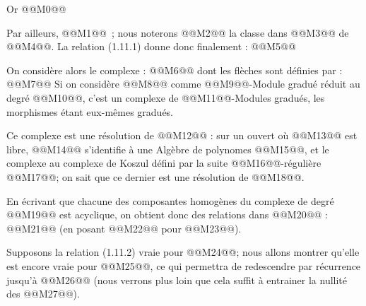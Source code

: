 
Or
@@M0@@

Par
ailleurs, @@M1@@~; nous noterons @@M2@@ la classe dans @@M3@@ de @@M4@@. La relation (1.11.1) donne donc finalement :
@@M5@@

On considère alors le complexe :
@@M6@@
dont les flèches sont définies par :
@@M7@@
Si on considère @@M8@@ comme @@M9@@-Module gradué réduit au degré @@M10@@, c'est un complexe de @@M11@@-Modules gradués, les morphismes étant eux-mêmes gradués.

Ce complexe est une résolution de @@M12@@ : sur un ouvert où @@M13@@ est libre, @@M14@@ s'identifie à une Algèbre de polynomes @@M15@@, et le complexe au complexe de Koszul défini par la suite @@M16@@-régulière @@M17@@; on sait que ce dernier est une résolution de @@M18@@.

En écrivant que chacune des composantes homogènes du complexe de degré @@M19@@ est acyclique, on obtient donc des relations dans @@M20@@ :
@@M21@@
(en posant @@M22@@ pour @@M23@@).

Supposons la relation (1.11.2) vraie pour @@M24@@; nous allons montrer qu'elle est encore vraie pour @@M25@@, ce qui permettra de redescendre par récurrence jusqu'à @@M26@@ (nous verrons plus loin que cela suffit à entrainer la nullité des @@M27@@).


